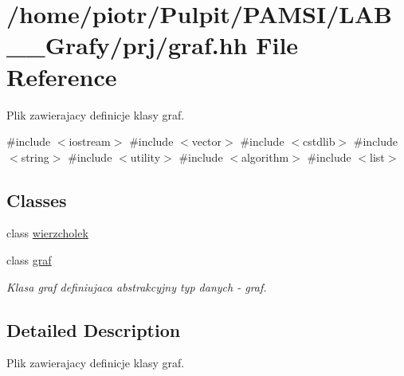 \hypertarget{graf_8hh}{\section{/home/piotr/\-Pulpit/\-P\-A\-M\-S\-I/\-L\-A\-B\-\_\-\_\-\-Grafy/prj/graf.hh \-File \-Reference}
\label{graf_8hh}
}


\-Plik zawierajacy definicje klasy graf.  


{\ttfamily \#include $<$iostream$>$}\*
{\ttfamily \#include $<$vector$>$}\*
{\ttfamily \#include $<$cstdlib$>$}\*
{\ttfamily \#include $<$string$>$}\*
{\ttfamily \#include $<$utility$>$}\*
{\ttfamily \#include $<$algorithm$>$}\*
{\ttfamily \#include $<$list$>$}\*
\subsection*{\-Classes}
\begin{DoxyCompactItemize}
\item 
class \hyperlink{classwierzcholek}{wierzcholek}
\item 
class \hyperlink{classgraf}{graf}
\begin{DoxyCompactList}\small\item\em \-Klasa graf definiujaca abstrakcyjny typ danych -\/ graf. \end{DoxyCompactList}\end{DoxyCompactItemize}


\subsection{\-Detailed \-Description}
\-Plik zawierajacy definicje klasy graf. 